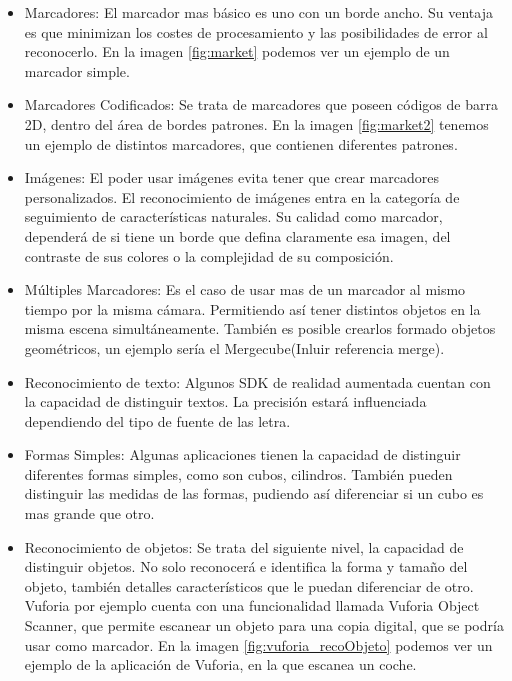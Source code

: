 	\begin{itemize}
		\item Marcadores: El marcador mas básico es uno con un borde ancho. Su ventaja es que minimizan los costes de procesamiento y las posibilidades de error al reconocerlo. En la imagen \ref{fig:market} podemos ver un ejemplo de un marcador simple.\\		
		\item Marcadores Codificados:
		Se trata de marcadores que poseen códigos de barra 2D, dentro del área de bordes patrones. En la imagen \ref{fig:market2} tenemos un ejemplo de distintos marcadores, que contienen diferentes patrones.
		\item Imágenes:		
		El poder usar imágenes evita tener que crear marcadores personalizados. El reconocimiento de imágenes entra en la categoría de seguimiento de características naturales. Su calidad como marcador, dependerá de si tiene un borde que defina claramente esa imagen, del contraste de sus colores o la complejidad de su composición.
		\item Múltiples Marcadores:
		Es el caso de usar mas de un marcador al mismo tiempo por la misma cámara. Permitiendo así tener distintos objetos en la misma escena simultáneamente. También es posible crearlos formado objetos geométricos, un ejemplo sería el Mergecube(Inluir referencia merge).
		\item Reconocimiento de texto:
		Algunos SDK de realidad aumentada cuentan con la capacidad de distinguir textos. La precisión estará influenciada dependiendo del tipo de fuente de las letra. 
		\item Formas Simples:
		Algunas aplicaciones tienen la capacidad de distinguir diferentes formas simples, como son cubos, cilindros. También pueden distinguir las medidas de las formas, pudiendo así diferenciar si un cubo es mas grande que otro.
		\item Reconocimiento de objetos:		
		Se trata del siguiente nivel, la capacidad de distinguir objetos. No solo reconocerá e identifica la forma y tamaño del objeto, también detalles característicos que le puedan diferenciar de otro. Vuforia por ejemplo cuenta con una funcionalidad llamada Vuforia Object Scanner, que permite escanear un objeto para una copia digital, que se podría usar como marcador. En la imagen \ref{fig:vuforia_recoObjeto} podemos ver un ejemplo de la aplicación de Vuforia, en la que escanea un coche.  
		
	\end{itemize}

